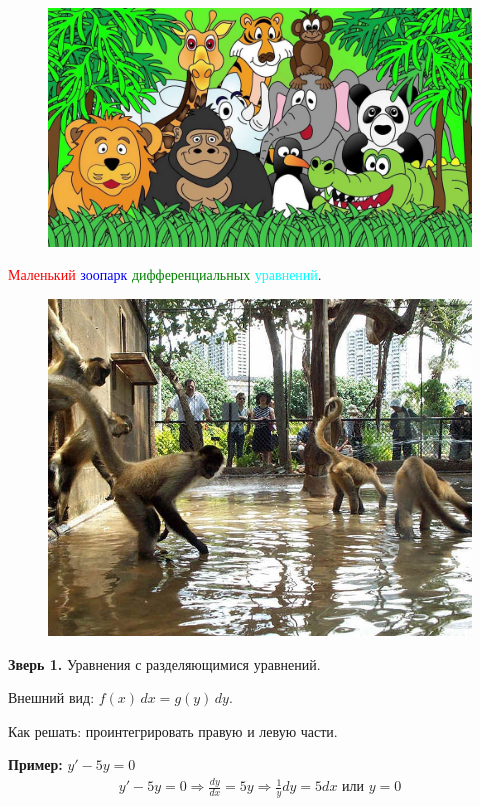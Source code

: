 \documentclass[10pt,a4paper]{article}
\begin{document}
\centering 
\pagecolor{Tan}
\begin{figure}[h]
\centering
\includegraphics[width=14cm]{all.jpg}
\end{figure}
\large{\textcolor{red}{Маленький} \textcolor{blue}{зоопарк} \textcolor{green}{дифференциальных} \textcolor{cyan}{уравнений}.} \\
\newpage
\pagecolor{cyan}
\begin{figure}[h]
\centering
\includegraphics[width=12cm]{monkey.png}
\end{figure}
\par \textbf{Зверь 1.} Уравнения с разделяющимися уравнений.
\par Внешний вид: $f(x) \, dx = g(y) \, dy$.
\par Как решать: проинтегрировать правую и левую части.
\par \textbf{Пример:} $y' - 5y = 0$
\begin{eqnarray*}
y' - 5y = 0 \Rightarrow \frac{dy}{dx} = 5y \Rightarrow \frac{1}{y}dy = 5 dx  \text{ или } y = 0
\end{eqnarray*}
\end{document}

